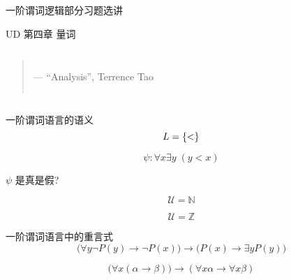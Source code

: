 \begin{frame}{}
  \centerline{\LARGE 一阶谓词逻辑部分习题选讲}
  \vspace{0.50cm}
  \centerline{\large UD 第四章 \; 量词}
\end{frame}

\begin{frame}{}
  \begin{columns}
      \begin{quote}


	\hfill --- ``Analysis'', Terrence Tao
      \end{quote}
  \end{columns}
\end{frame}

\begin{frame}{一阶谓词语言的语义}
  \[
    L = \{<\}
  \]

  \[
    \psi: \forall x \exists y \; (y < x)
  \]

  \vspace{0.30cm}
  \pause
  \centerline{ $\psi$ 是真是假?}

  \vspace{0.50cm}
  \pause
  \[
    \mathcal{U} = \mathbb{N}
  \]

  \pause
  \[
    \mathcal{U} = \mathbb{Z}
  \]
\end{frame}

\begin{frame}{一阶谓词语言中的重言式}
  \pause
  \[
    \Big(\forall y \lnot P(y) \to \lnot P(x)\Big) \to \Big(P(x) \to \exists y P(y)\Big)
  \]

  \[
    \Big(\forall x (\alpha \to \beta)\Big) \to (\forall x \alpha \to \forall x \beta)
  \]
\end{frame}


